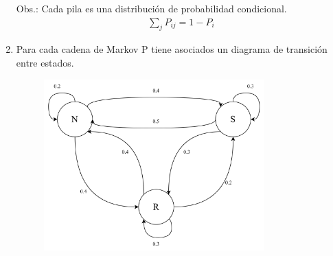 \documentclass{templateNote}
\begin{document}
\begin{enumerate}
    Obs.: Cada pila es una distribución de probabilidad condicional.\\

    \begin{align*}
        \sum_{j}^{} P_{ij} = 1 - P_i
    \end{align*}

    \newpage
    \item Para cada cadena de Markov P tiene asociados un diagrama de transición entre estados.
    \begin{figure}[H]
        \centering
        \includegraphics[width=0.8\textwidth]{img/estados.png}
    \end{figure}
\end{enumerate}
\end{document}
